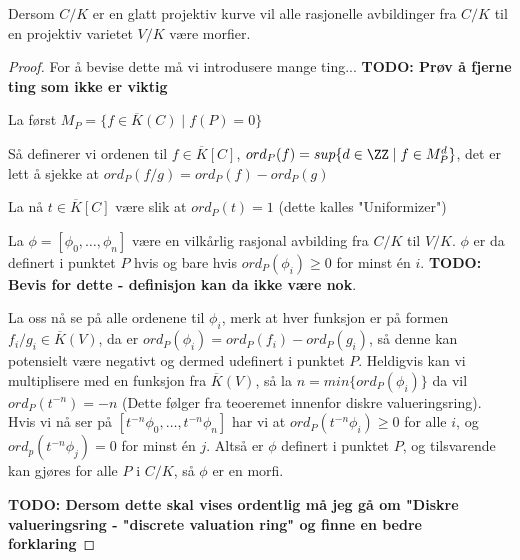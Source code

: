 \begin{teorem}
Dersom $C/K$ er en glatt projektiv kurve vil alle rasjonelle avbildinger fra $C/K$ til en projektiv varietet $V/K$ være morfier.

\begin{proof}
For å bevise dette må vi introdusere mange ting... \textbf{TODO: Prøv å fjerne ting som ikke er viktig}

La først $M_P = \{f \in \overline{K}(C) \mid f(P) = 0\}$

Så definerer vi ordenen til $f \in \overline{K}[C]$, $ord_P(f) = sup\{d \in \ZZ \mid f \in M_P^d\}$, det er lett å sjekke at $ord_P(f/g) = ord_P(f) - ord_P(g)$

La nå $t \in \overline{K}[C]$ være slik at $ord_P(t) = 1$ (dette kalles "Uniformizer")

La $\phi = [\phi_0, \ldots, \phi_n]$ være en vilkårlig rasjonal avbilding fra $C/K$ til $V/K$. $\phi$ er da definert i punktet $P$ hvis og bare hvis $ord_P(\phi_i) \geq 0$ for minst én $i$. \textbf{TODO: Bevis for dette - definisjon kan da ikke være nok}.

La oss nå se på alle ordenene til $\phi_i$, merk at hver funksjon er på formen $f_i/g_i \in \overline{K}(V)$, da er $ord_P(\phi_i) = ord_P(f_i) - ord_P(g_i)$, så denne kan potensielt være negativt og dermed udefinert i punktet $P$. Heldigvis kan vi multiplisere med en funksjon fra $\overline{K}(V)$, så la $n = min\{ord_P(\phi_i)\}$ da vil $ord_P(t^{-n}) = -n$ (Dette følger fra teoeremet innenfor diskre valueringsring). Hvis vi nå ser på $[t^{-n}\phi_0, \ldots, t^{-n}\phi_n]$ har vi at $ord_P(t^{-n}\phi_i) \geq 0$ for alle $i$, og $ord_p(t^{-n}\phi_j) = 0$ for minst én $j$. Altså er $\phi$ definert i punktet $P$, og tilsvarende kan gjøres for alle $P$ i $C/K$, så $\phi$ er en morfi.


\textbf{TODO: Dersom dette skal vises ordentlig må jeg gå om "Diskre valueringsring - "discrete valuation ring" og finne en bedre forklaring}
\end{proof}
\end{teorem}

